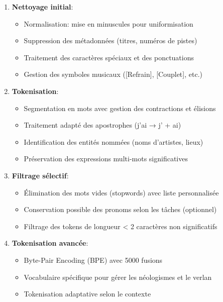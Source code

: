 \documentclass[a4paper,11pt]{article}
\begin{document}
\begin{enumerate}
    \item \textbf{Nettoyage initial}:
    \begin{itemize}
        \item Normalisation: mise en minuscules pour uniformisation
        \item Suppression des métadonnées (titres, numéros de pistes)
        \item Traitement des caractères spéciaux et des ponctuations
        \item Gestion des symboles musicaux ([Refrain], [Couplet], etc.)
    \end{itemize}

    \item \textbf{Tokenisation}:
    \begin{itemize}
        \item Segmentation en mots avec gestion des contractions et élisions
        \item Traitement adapté des apostrophes (j'ai → j' + ai)
        \item Identification des entités nommées (noms d'artistes, lieux)
        \item Préservation des expressions multi-mots significatives
    \end{itemize}

    \item \textbf{Filtrage sélectif}:
    \begin{itemize}
        \item Élimination des mots vides (stopwords) avec liste personnalisée
        \item Conservation possible des pronoms selon les tâches (optionnel)
        \item Filtrage des tokens de longueur < 2 caractères non significatifs
    \end{itemize}

    \item \textbf{Tokenisation avancée}:
    \begin{itemize}
        \item Byte-Pair Encoding (BPE) avec 5000 fusions
        \item Vocabulaire spécifique pour gérer les néologismes et le verlan
        \item Tokenisation adaptative selon le contexte
    \end{itemize}
\end{enumerate}
\end{document}
